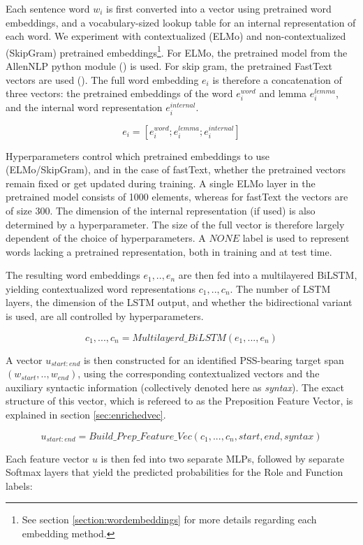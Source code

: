 Each sentence word $w_i$ is first converted into a vector using pretrained word embeddings, and a vocabulary-sized lookup table for an internal representation of each word. We experiment with contextualized (ELMo) and non-contextualized (SkipGram) pretrained embeddings\footnote{See section \ref{section:wordembeddings} for more details regarding each embedding method.}. For ELMo, the pretrained model from the AllenNLP python module (\cite{allennlp}) is used. For skip gram, the pretrained FastText vectors are used (\cite{fasttext}). The full word embedding $e_i$ is therefore a concatenation of three vectors: the pretrained embeddings of the word $e^{word}_i$ and lemma $e^{lemma}_i$, and the internal word representation $e^{internal}_i$. 

$$ e_i = [e^{word}_i;e^{lemma}_i;e^{internal}_i] $$ 

Hyperparameters control which pretrained embeddings to use (ELMo/SkipGram), and in the case of fastText, whether the pretrained vectors remain fixed or get updated during training. A single ELMo layer in the pretrained model consists of 1000 elements, whereas for fastText the vectors are of size 300. The dimension of the internal representation (if used) is also determined by a hyperparameter. The size of the full vector is therefore largely dependent of the choice of hyperparameters. A $NONE$ label is used to represent words lacking a pretrained representation, both in training and at test time.

The resulting word embeddings $e_1, .. ,e_n$ are then fed into a multilayered BiLSTM, yielding contextualized word representations $c_1, .. ,c_n$. The number of LSTM layers, the dimension of the LSTM output, and whether the bidirectional variant is used, are all controlled by hyperparameters.

$$ c_1, ... , c_n = Multilayerd\_BiLSTM(e_1, ... ,e_n)$$

A vector $u_{start:end}$ is then constructed for an identified PSS-bearing target span $(w_{start}, .., w_{end})$, using the corresponding contextualized vectors and the auxiliary syntactic information (collectively denoted here as \emph{syntax}). The exact structure of this vector, which is refereed to as the Preposition Feature Vector, is explained in section \ref{sec:enrichedvec}. 

$$u_{start:end} = Build\_Prep\_Feature\_Vec(c_1, ... ,c_n, start, end, syntax)$$

Each feature vector $u$ is then fed into two separate MLPs, followed by separate Softmax layers that
yield the predicted probabilities for the Role and
Function labels:

